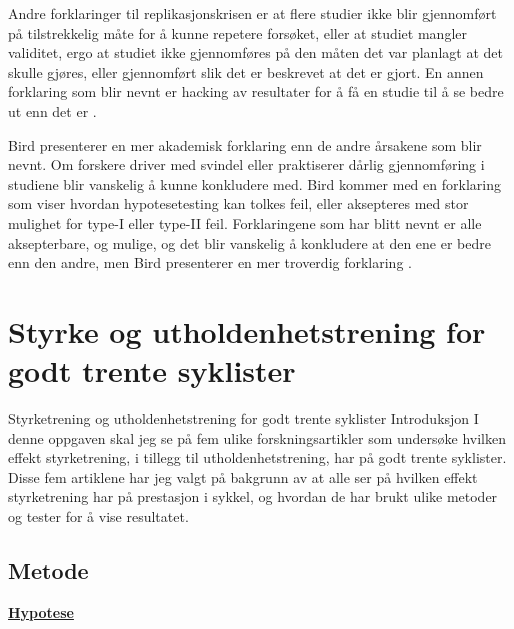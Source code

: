 \documentclass[
]{book}
\begin{document}
Andre forklaringer til replikasjonskrisen er at flere studier ikke blir gjennomført på tilstrekkelig måte for å kunne repetere forsøket, eller at studiet mangler validitet, ergo at studiet ikke gjennomføres på den måten det var planlagt at det skulle gjøres, eller gjennomført slik det er beskrevet at det er gjort. En annen forklaring som blir nevnt er hacking av resultater for å få en studie til å se bedre ut enn det er \citep{bird2020}.

Bird presenterer en mer akademisk forklaring enn de andre årsakene som blir nevnt. Om forskere driver med svindel eller praktiserer dårlig gjennomføring i studiene blir vanskelig å kunne konkludere med. Bird kommer med en forklaring som viser hvordan hypotesetesting kan tolkes feil, eller aksepteres med stor mulighet for type-I eller type-II feil. Forklaringene som har blitt nevnt er alle aksepterbare, og mulige, og det blir vanskelig å konkludere at den ene er bedre enn den andre, men Bird presenterer en mer troverdig forklaring \citep{bird2020}.

\hypertarget{styrke-og-utholdenhetstrening-for-godt-trente-syklister}{%
\chapter{Styrke og utholdenhetstrening for godt trente syklister}\label{styrke-og-utholdenhetstrening-for-godt-trente-syklister}}

Styrketrening og utholdenhetstrening for godt trente syklister Introduksjon I denne oppgaven skal jeg se på fem ulike forskningsartikler som undersøke hvilken effekt styrketrening, i tillegg til utholdenhetstrening, har på godt trente syklister. Disse fem artiklene har jeg valgt på bakgrunn av at alle ser på hvilken effekt styrketrening har på prestasjon i sykkel, og hvordan de har brukt ulike metoder og tester for å vise resultatet.

\hypertarget{metode-2}{%
\section{Metode}\label{metode-2}}

\underline{\textbf{Hypotese}}
\end{document}
